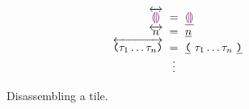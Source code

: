 \begin{figure}
  \vspace{-3px}
  \[
  \setlength{\fboxsep}{1pt}
  \arraycolsep=3pt\begin{array}{rcl}
      \disassembleTile{\shole} & = & \tokenLit{\shole} \\
      \disassembleTile{\snumlit{n}} & = & \tokenLit{\snumlit{n}} \\
      \disassembleTile{\sparen{\tile_1\dots\tile_n}}
        & = & \tokenLit{\texttt{(}}\ \tile_1\dots\tile_n\ \tokenLit{\texttt{)}} \\
      & \vdots &
  \end{array}\]
  \caption{
    Disassembling a tile.
  }
  \label{fig:disassemble-tile}
\end{figure}